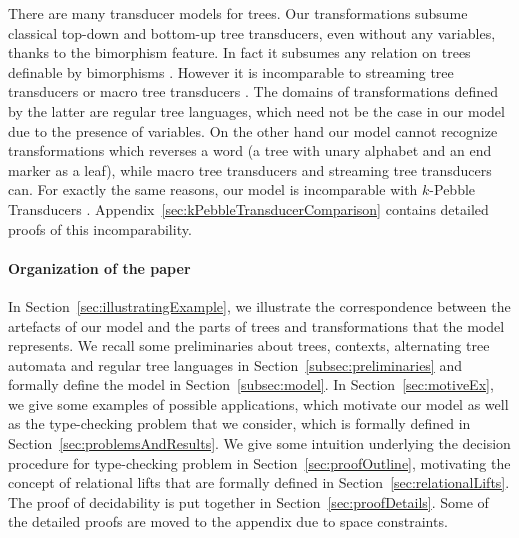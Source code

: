 There are many transducer models for trees. Our transformations
subsume classical top-down and bottom-up tree transducers, even
without any variables, thanks to the bimorphism feature. In fact it
subsumes any relation on trees definable by bimorphisms \cite[Chapter
6]{tata}. However it is incomparable to streaming tree transducers
\cite{StreamingTreeTransd} or macro tree transducers
\cite{MacroTreeTransd}. The domains of transformations defined by
the latter are regular tree languages, which need not be the case in
our model due to the presence of variables. On the other hand our
model cannot recognize transformations which reverses a word (a tree
with unary alphabet and an end marker as a leaf), while macro tree
transducers and streaming tree transducers can. For exactly the same
reasons, our model is incomparable with \texorpdfstring{$k$}{k}-Pebble
Transducers \cite{MSV2000}.
Appendix~\ref{sec:kPebbleTransducerComparison} contains detailed
proofs of this incomparability.

\paragraph*{Organization of the paper}
In Section~\ref{sec:illustratingExample}, we illustrate the correspondence
between the artefacts of our model and the parts of trees
and transformations that the model represents. We recall some
preliminaries about trees, contexts, alternating tree automata and
regular tree languages in Section~\ref{subsec:preliminaries} and formally define the
model in Section~\ref{subsec:model}. In
Section~\ref{sec:motiveEx}, we give some examples of possible
applications, which motivate our model as well as the type-checking problem that we
consider, which is formally defined in
Section~\ref{sec:problemsAndResults}. We give some intuition
underlying the decision procedure for type-checking problem in
Section~\ref{sec:proofOutline}, motivating the concept of relational
lifts that are formally defined in Section~\ref{sec:relationalLifts}.
The proof of decidability is put together in
Section~\ref{sec:proofDetails}. Some of the detailed proofs are moved
to the appendix due to space constraints.